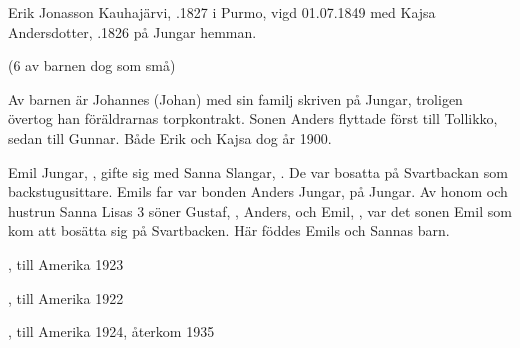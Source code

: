 %
Erik Jonasson Kauhajärvi, .1827 i Purmo, vigd 01.07.1849 med Kajsa Andersdotter, .1826 på Jungar hemman.
\begin{jhchildren}
  \item {}
  \item {}
  \item {}
  \item {}
  \item {}
  \item {}
  \item {}
  \item {}
  \item {}
  \item {}
\end{jhchildren}
(6 av barnen dog som små)

Av barnen är Johannes (Johan) med sin familj skriven på Jungar, troligen övertog han föräldrarnas torpkontrakt. Sonen Anders flyttade först till Tollikko, sedan till Gunnar. Både Erik och Kajsa dog år 1900.



%


%
Emil Jungar, ,  gifte sig med Sanna Slangar, . De var bosatta på Svartbackan som backstugusittare. Emils far var bonden Anders Jungar,  på Jungar. Av honom och hustrun Sanna Lisas 3 söner Gustaf, , Anders,  och Emil, , var det sonen Emil som kom att bosätta sig på Svartbacken. Här föddes Emils och Sannas barn.
\begin{jhchildren}
  \item {}, till Amerika 1923
  \item {}, till Amerika 1922
  \item {}, till Amerika 1924, återkom 1935
\end{jhchildren}

